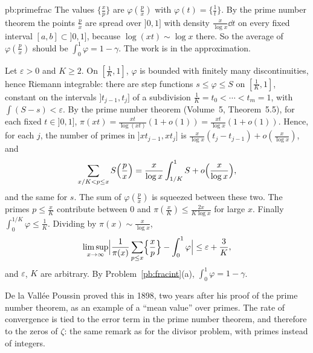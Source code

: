 \begin{solution}{pb:primefrac}
\idea The values $\{\frac xp\}$ are $\varphi(\frac px)$ with $\varphi(t)=\{\frac1t\}$. By the prime number theorem the points $\frac px$ are spread over
$]0,1]$ with density $\frac x{\log x}\dd t$ on every fixed interval $[a,b]\subset]0,1]$, because $\log(xt)\sim\log x$ there. So the average of
$\varphi(\frac px)$ should be $\int_0^1\varphi=1-\gamma$. The work is in the approximation.

\writeup Let $\varepsilon>0$ and $K\ge2$. On $[\frac1K,1]$, $\varphi$ is bounded with finitely many discontinuities, hence Riemann integrable: there
are step functions $s\le\varphi\le S$ on $[\frac1K,1]$, constant on the intervals $]t_{j-1},t_j]$ of a subdivision $\frac1K=t_0<\cdots<t_m=1$, with
$\int(S-s)<\varepsilon$. By the prime number theorem (Volume~5, Theorem~5.5), for each fixed $t\in]0,1]$, $\pi(xt)=\frac{xt}{\log(xt)}(1+o(1))=\frac{xt}{\log x}(1+o(1))$.
Hence, for each $j$, the number of primes in $]xt_{j-1},xt_j]$ is $\frac x{\log x}(t_j-t_{j-1})+o(\frac x{\log x})$, and
\[
\sum_{x/K<p\le x}S\Bigl(\frac px\Bigr)=\frac x{\log x}\int_{1/K}^1S+o\Bigl(\frac x{\log x}\Bigr),
\]
and the same for $s$. The sum of $\varphi(\frac px)$ is squeezed between these two. The primes $p\le\frac xK$ contribute between $0$ and
$\pi(\frac xK)\le\frac{2x}{K\log x}$ for large $x$. Finally $\int_0^{1/K}\varphi\le\frac1K$. Dividing by $\pi(x)\sim\frac x{\log x}$,
\[
\limsup_{x\to\infty}\Bigl|\frac1{\pi(x)}\sum_{p\le x}\Bigl\{\frac xp\Bigr\}-\int_0^1\varphi\Bigr|\le\varepsilon+\frac3K,
\]
and $\varepsilon$, $K$ are arbitrary. By Problem~\ref{pb:fracint}(a), $\int_0^1\varphi=1-\gamma$.

\leads De la Vallée Poussin proved this in 1898, two years after his proof of the prime number theorem, as an example of a ``mean
value'' over primes. The rate of convergence is tied to the error term in the prime number theorem, and therefore to the zeros of
$\zeta$: the same remark as for the divisor problem, with primes instead of integers.
\end{solution}

